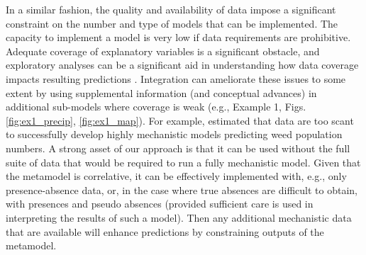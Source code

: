 In a similar fashion, the quality and availability of data impose a significant constraint on the number and type of models that can be implemented.
The capacity to implement a model is very low if data requirements are prohibitive. 
Adequate coverage of explanatory variables is a significant obstacle, and exploratory analyses can be a significant aid in understanding how data coverage impacts resulting predictions \citep{Mckenney2002}.
Integration can ameliorate these issues to some extent by using supplemental information (and conceptual advances) in additional sub-models where coverage is weak (e.g., Example 1, Figs. \ref{fig:ex1_precip}, \ref{fig:ex1_map}).
For example, \citet{Freckleton2009} estimated that data are too scant to successfully develop highly mechanistic models predicting weed population numbers. 
A strong asset of our approach is that it can be used without the full suite of data that would be required to run a fully mechanistic model. 
Given that the metamodel is correlative, it can be effectively implemented with, e.g., only presence-absence data, or, in the case where true absences are difficult to obtain, with presences and pseudo absences (provided sufficient care is used in interpreting the results of such a model).
Then any additional mechanistic data that are available will enhance predictions by constraining outputs of the metamodel. 


